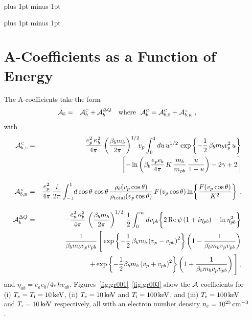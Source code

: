 \documentclass[preprint,12pt,eqsecnum,nofootinbib,amsmath,amssymb]{revtex4}
\newcommand{\smC}{{\rm\scriptscriptstyle C}}
\newcommand{\smI}{{\rm\scriptscriptstyle I}}
\newcommand{\smR}{{\rm\scriptscriptstyle R}}
\newcommand{\smS}{{\rm\scriptscriptstyle S}}
\newcommand{\smLT}{{\rm\scriptscriptstyle <}}
\newcommand{\bodyskip}{\baselineskip 18pt plus 1pt minus 1pt}
\newcommand{\tableofcontentsskip}{\baselineskip 14pt plus 1pt minus 1pt}
\begin{document}
\maketitle


\pagebreak
\tableofcontentsskip
\tableofcontents

\newpage
\bodyskip

\pagebreak
\clearpage

\newpage

\section{A-Coefficients as a Function of Energy}

The {\cal A}-coefficients take the form
\begin{eqnarray}
  {\cal A}_b 
  &=&  
  {\cal A}^\smC_b + {\cal A}^{\Delta Q}_b 
  ~~~\text{where}~~
  {\cal A}^\smC_b 
  =
  {\cal A}^\smC_{b,\smS} +  {\cal A}^\smLT_{b,\smR} \ ,
\label{all}
\end{eqnarray}
with
\begin{eqnarray}
  {\cal A}^\smC_{b,\smS}
  &=& 
  \frac{e_p^2\,\kappa^2_b}{4\pi} \,   
  \left( \frac{\beta_b m_b}{2\pi} \right)^{1/2}\!\!
  v_p\int_0^1 du \, u^{1/2} \,\exp\left\{ - \frac{1}{2} \,
  \beta_b m_b v^2_p \, u \right\}
\nonumber\\
  && \qquad
  \left[ -\ln \left(\beta_b  \frac{e_p e_b}{4\pi} \,
  K \, \frac{m_b}{m_{pb}} \, \frac{u}{1-u} \right) 
  - 2 \gamma + 2 \right] 
\label{wonderclassic}
\\[10pt]
  {\cal A}^\smLT_{b,\smR}
  &=&
  \frac{e_p^2}{4 \pi}\, \frac{i}{2 \pi}
  \int_{-1}^1 \! d\cos\theta\, \cos\theta\,
  \frac{\rho_b(v_p\cos\theta)}
  {\rho_{\rm total}(v_p\cos\theta)}\,F(v_p \cos\theta) 
  \ln\!\left\{\frac{F(v_p\cos\theta)}{K^2}\right\} \,, 
\label{nun}
\\[10pt]
  {\cal A}^{\Delta Q}_b
  &=&
  -\frac{e_p^2\, \kappa_b^2}{4 \pi}\,
  \left( \frac{\beta_b m_b}{2\pi} \right)^{1/2}\,
  \frac{1}{2}\int_0^\infty dv_{pb}
  \bigg\{ 2\, {\rm Re} \, \psi \left( 1 + i \eta_{pb}
  \right) - \ln \eta^2_{pb}  \bigg\}
\nonumber\\
  &&
  \frac{1}{\beta_b m_b v_p v_{pb}} \, 
  \Bigg[ \exp\left\{ - \frac{1}{2}\, \beta_b
  m_b \left( v_p - v_{pb} \right)^2\right\} 
   \left( 1 - \frac{1}{\beta_b m_b v_p v_{pb} } \right) 
\nonumber\\
  && \qquad\qquad\quad
  + \exp\left\{ - \frac{1}{2} \beta_b m_b \left( v_p + v_{pb} 
  \right)^2\right\} 
   \left( 1 + \frac{1}{\beta_b m_b v_p v_{pb} } \right) 
\Bigg]	\,,
\label{regb}
\end{eqnarray}
and $\eta_{ab}=e_a e_b/4\pi\hbar v_{ab}$.
Figures~\ref{fig:gr001}--\ref{fig:gr003} show the ${\cal A
}$-coefficients for (i) $T_e = T_\smI=10\,{\rm keV}$, (ii) $T_e =
10\,{\rm keV}$ and $T_\smI=100\,{\rm keV}$, and (iii) $T_e=100\,{\rm
  keV}$ and $T_\smI=10\,{\rm keV}$ respectively, all with an electron
number density $n_e=10^{25}\,{\rm cm^{-3}}$.
\end{document}
